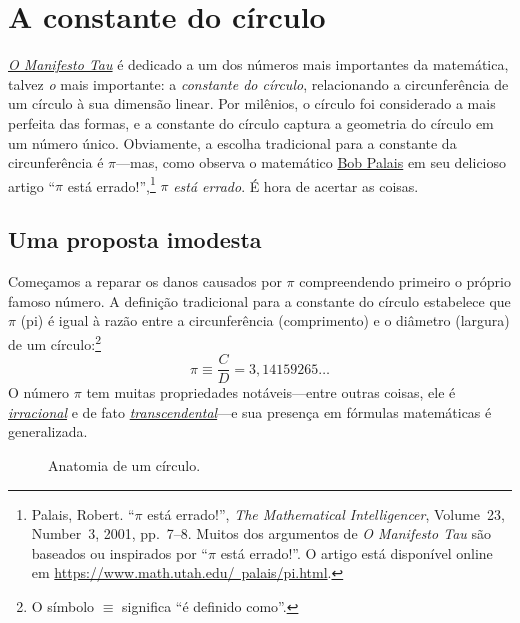\section{A constante do círculo} %
\label{sec:the_circle_constant}

\href{https://tauday.com/tau-manifesto}{\emph{O Manifesto Tau}} é dedicado a um dos números mais importantes da matemática, talvez \emph{o} mais importante: a \emph{constante do círculo}, relacionando a circunferência de um círculo à sua dimensão linear. Por milênios, o círculo foi considerado a mais perfeita das formas, e a constante do círculo captura a geometria do círculo em um número único. Obviamente, a escolha tradicional para a constante da circunferência é $\pi$---mas, como observa o matemático \href{https://www.math.utah.edu/~palais/}{Bob Palais} em seu delicioso artigo ``$\pi$ está errado!'',\footnote{Palais, Robert. ``$\pi$ está errado!'', \emph{The Mathematical Intelligencer}, Volume~23, Number~3, 2001, pp.~7--8. Muitos dos argumentos de \emph{O Manifesto Tau} são baseados ou inspirados por ``$\pi$ está errado!''. O artigo está disponível online em \href{https://www.math.utah.edu/~palais/pi.html}{https://www.math.utah.edu/~palais/pi.html}.} $\pi$ \emph{está errado}. É hora de acertar as coisas.

  \subsection{Uma proposta imodesta} %
  \label{sec:an_immodest_proposal}

Começamos a reparar os danos causados ​​por $\pi$ compreendendo primeiro o próprio famoso número. A definição tradicional para a constante do círculo estabelece que $\pi$ (pi) é igual à razão entre a circunferência (comprimento) e o diâmetro (largura) de um círculo:\footnote{O símbolo $\equiv$ significa ``é definido como''.}
\begin{equation}
\label{eq:pi}
\pi \equiv \frac{C}{D} = 3,14159265\ldots
\end{equation}
O número $\pi$ tem muitas propriedades notáveis---entre outras coisas, ele é \href{https://pt.wikipedia.org/wiki/N%C3%BAmero_irracional}{\emph{irracional}} e de fato \href{https://pt.wikipedia.org/wiki/N%C3%BAmero_transcendente}{\emph{transcendental}}---e sua presença em fórmulas matemáticas é generalizada.

\begin{figure}
\caption{Anatomia de um círculo.\label{fig:circle}}
\end{figure}

